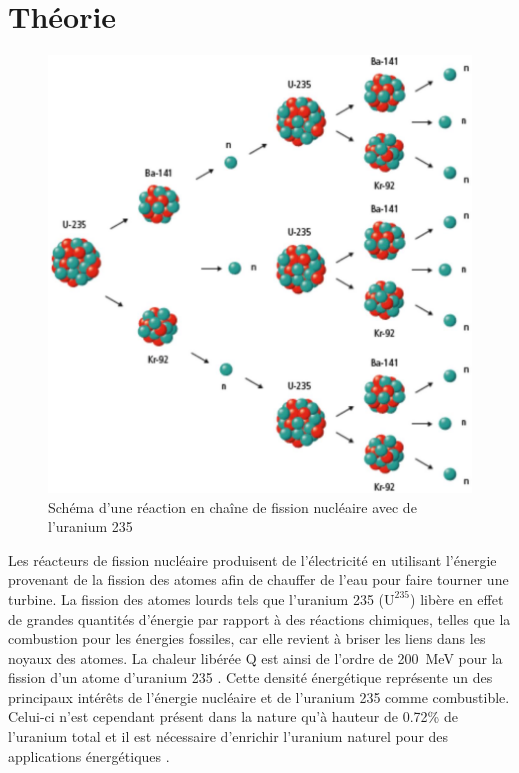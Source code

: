 \section{Théorie}
\begin{figure}
    \includegraphics[width=\linewidth]{figures/fission.png}
    \caption{Schéma d'une réaction en chaîne de fission nucléaire avec de l'uranium 235 \cite{notice}}
    \label{fig:fission}
\end{figure}
Les réacteurs de fission nucléaire produisent de l'électricité en utilisant l'énergie provenant de la fission des atomes afin de chauffer de l'eau pour faire tourner une turbine. La fission des atomes lourds tels que l'uranium 235 ($\mathrm{U}^{235}$) libère en effet de grandes quantités d'énergie par rapport à des réactions chimiques, telles que la combustion pour les énergies fossiles, car elle revient à briser les liens dans les noyaux des atomes. La chaleur libérée $\mathrm{Q}$ est ainsi de l'ordre de \mbox{200 \si{\mega\electronvolt}} pour la fission d'un atome d'uranium 235 \cite{notice}. Cette densité énergétique représente un des principaux intérêts de l'énergie nucléaire et de l'uranium 235 comme combustible. Celui-ci n'est cependant présent dans la nature qu'à hauteur de 0.72\% de l'uranium total et il est nécessaire d'enrichir l'uranium naturel pour des applications énergétiques \cite{notice}.

